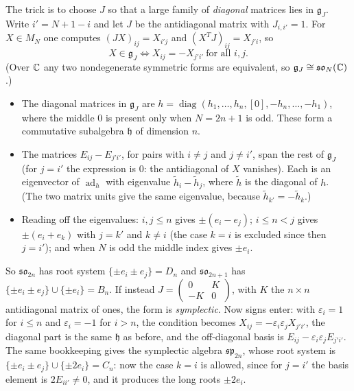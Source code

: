 The trick is to choose $J$ so that a large family of \emph{diagonal} matrices lies in $\mathfrak g_J$.
Write $i'=N+1-i$ and let $J$ be the antidiagonal matrix with $J_{i,i'}=1$. For $X\in M_N$ one computes
$(JX)_{ij}=X_{i'j}$ and $(X^TJ)_{ij}=X_{j'i}$, so
\[
  X\in\mathfrak g_J\iff X_{ij}=-X_{j'i'}\ \text{for all } i,j .
\]
(Over $\mathbb{C}$ any two nondegenerate symmetric forms are equivalent, so $\mathfrak g_J\cong\mathfrak{so}_N(\mathbb{C})$.)
\begin{itemize}
\item The diagonal matrices in $\mathfrak g_J$ are
  $h=\operatorname{diag}(h_1,\dots,h_n,[0],-h_n,\dots,-h_1)$, where the middle $0$ is present only when
  $N=2n+1$ is odd. These form a commutative subalgebra $\mathfrak h$ of dimension $n$.
\item The matrices $E_{ij}-E_{j'i'}$, for pairs with $i\neq j$ and $j\neq i'$, span the rest of
  $\mathfrak g_J$ (for $j=i'$ the expression is $0$: the antidiagonal of $X$ vanishes). Each is
  an eigenvector of $\operatorname{ad}_h$ with eigenvalue $\tilde h_i-\tilde h_j$, where $\tilde h$ is the
  diagonal of $h$. (The two matrix units give the same eigenvalue, because $\tilde h_{k'}=-\tilde h_k$.)
\item Reading off the eigenvalues: $i,j\le n$ gives $\pm(e_i-e_j)$; $i\le n<j$ gives
  $\pm(e_i+e_k)$ with $j=k'$ and $k\neq i$ (the case $k=i$ is excluded since then $j=i'$); and when $N$
  is odd the middle index gives $\pm e_i$.
\end{itemize}
So $\mathfrak{so}_{2n}$ has root system $\{\pm e_i\pm e_j\}=D_n$ and $\mathfrak{so}_{2n+1}$ has
$\{\pm e_i\pm e_j\}\cup\{\pm e_i\}=B_n$. If instead
$J=\left(\begin{smallmatrix}0&K\\-K&0\end{smallmatrix}\right)$, with $K$ the $n\times n$ antidiagonal
matrix of ones, the form is \emph{symplectic}. Now signs enter: with $\varepsilon_i=1$ for $i\le n$
and $\varepsilon_i=-1$ for $i>n$, the condition becomes $X_{ij}=-\varepsilon_i\varepsilon_jX_{j'i'}$, the
diagonal part is the same $\mathfrak h$ as before, and the off-diagonal basis is
$E_{ij}-\varepsilon_i\varepsilon_jE_{j'i'}$. The same bookkeeping gives the symplectic algebra
$\mathfrak{sp}_{2n}$, whose root system is $\{\pm e_i\pm e_j\}\cup\{\pm 2e_i\}=C_n$: now the case $k=i$ is
allowed, since for $j=i'$ the basis element is $2E_{ii'}\neq0$, and it produces the long roots $\pm2e_i$.

